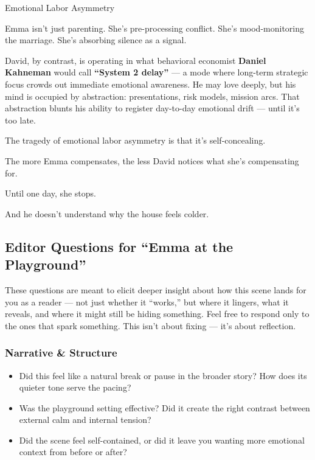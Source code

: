 \begin{PsychologicalSidebar}{Emotional Labor Asymmetry}
    \medskip
    
    Emma isn’t just parenting. She’s pre-processing conflict.  
    She’s mood-monitoring the marriage.  
    She’s absorbing silence as a signal.
    
    \medskip
    
    David, by contrast, is operating in what behavioral economist \textbf{Daniel Kahneman} would call 
    \textbf{“System 2 delay”} — a mode where long-term strategic focus crowds out immediate emotional 
    awareness. He may love deeply, but his mind is occupied by abstraction: presentations, risk models, 
    mission arcs. That abstraction blunts his ability to register day-to-day emotional drift — until 
    it's too late.
    
    \medskip
    
    The tragedy of emotional labor asymmetry is that it’s self-concealing.

    \medskip
    
    The more Emma compensates, the less David notices what she's compensating for.

    \medskip
    
    Until one day, she stops.

    \medskip
    
    And he doesn’t understand why the house feels colder.
    
\end{PsychologicalSidebar}

\subsection*{Editor Questions for ``Emma at the Playground''}

These questions are meant to elicit deeper insight about how this scene lands for you as a reader — not just whether it “works,” but where it lingers, what it reveals, and where it might still be hiding something. Feel free to respond only to the ones that spark something. This isn’t about fixing — it’s about reflection.

\subsubsection*{Narrative \& Structure}

\begin{itemize}
  \item Did this feel like a natural break or pause in the broader story? How does its quieter tone serve the pacing?
  \item Was the playground setting effective? Did it create the right contrast between external calm and internal tension?
  \item Did the scene feel self-contained, or did it leave you wanting more emotional context from before or after?
\end{itemize}


